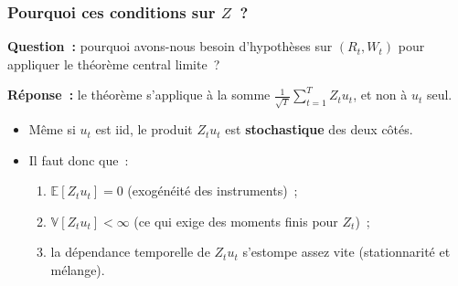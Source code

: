 \documentclass[10pt]{beamer}
\begin{document}
\begin{frame}
  \frametitle{Pourquoi ces conditions sur $Z$~?}

  \textbf{Question~:} pourquoi avons-nous besoin d'hypothèses sur $(R_t, W_t)$
  pour appliquer le théorème central limite~?

  \medskip

  \textbf{Réponse~:} le théorème s'applique à la somme
  $\frac{1}{\sqrt{T}}\sum_{t=1}^{T}Z_t u_t$, et non à $u_t$ seul.

  \begin{itemize}

  \item Même si $u_t$ est iid, le produit $Z_t u_t$ est \textbf{stochastique} des
    deux côtés.\newline

  \item Il faut donc que~:
    \begin{enumerate}
    \item $\mathbb{E}[Z_t u_t] = 0$ (exogénéité des instruments)~;
    \item $\mathbb V[Z_t u_t] < \infty$ (ce qui exige des moments finis
      pour $Z_t$)~;
    \item la dépendance temporelle de $Z_tu_t$ s'estompe assez vite
      (stationnarité et mélange).
    \end{enumerate}

  \end{itemize}

\end{frame}
\end{document}
